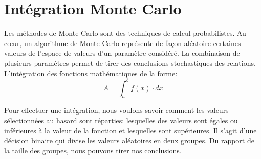 \documentclass[%
oneside,                 %
final,                   %
10pt]{article}
\begin{document}
% 
% 
% 
% 
% 
% 
% 

\section{Intégration Monte Carlo}
Les méthodes de Monte Carlo sont des techniques de calcul probabilistes. Au cœur, un algorithme de Monte Carlo représente de façon aléatoire certaines valeurs de l'espace de valeurs d'un paramètre considéré. La combinaison de plusieurs paramètres permet de tirer des conclusions stochastiques des relations. L'intégration des fonctions mathématiques de la forme:
\begin{equation*}
A = \int_a^b f(x) \cdot dx
\end{equation*}

Pour effectuer une intégration, nous voulons savoir comment les valeurs sélectionnées au hasard sont réparties: lesquelles des valeurs sont égales ou inférieures à la valeur de la fonction et lesquelles sont supérieures. Il s'agit d'une décision binaire qui divise les valeurs aléatoires en deux groupes. Du rapport de la taille des groupes, nous pouvons tirer nos conclusions.
\end{document}
